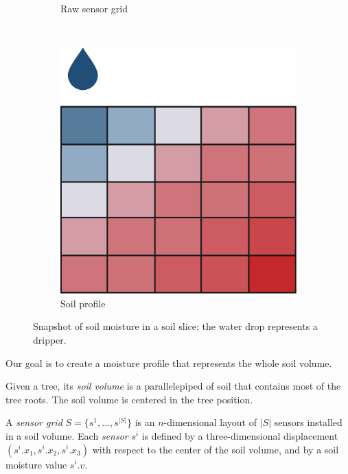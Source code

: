 \begin{figure}[t]
\begin{subfigure}[t]{.3\textwidth}
\caption{Raw sensor grid}
\label{pluto-fig:moisture-sens}
\end{subfigure}
~
\begin{subfigure}[t]{.3\textwidth}
\centering
\includegraphics[scale=.15]{chapters/physics-aware/pluto/img/soil-moisture-profile.pdf}
\caption{Soil profile}
\label{pluto-fig:moisture-profile}
\end{subfigure}
\caption{Snapshot of soil moisture in a soil slice; the water drop represents a dripper.}
\label{pluto-fig:moisture}
\end{figure}

Our goal is to create a moisture profile that represents the whole soil volume.
\begin{definition}
Given a tree, its \emph{soil volume} is a parallelepiped of soil that contains most of the tree roots. The soil volume is centered in the tree position.
\end{definition}

\begin{definition}
A \emph{sensor grid} $S = \{s^1, ..., s^{|S|}\}$ is an $n$-dimensional layout of $|S|$ sensors installed in a soil volume.
Each \emph{sensor} $s^i$ is defined by a three-dimensional displacement $(s^i.x_1, s^i.x_2,s^i.x_3)$ with respect to the center of the soil volume, and by a soil moisture value $s^i.v$. 
\end{definition}


